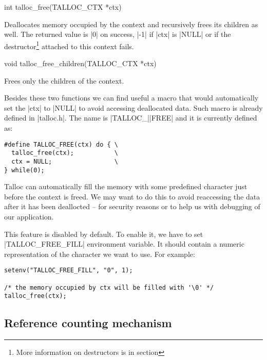 \begin{funcproto}
int talloc_free(TALLOC_CTX *ctx)
\end{funcproto}
\begin{funcdesc}
  Deallocates memory occupied by the context and recursively frees its
  children as well. The returned value is |0| on success, |-1| if |ctx| is
  |NULL| or if the destructor\footnote{More information on destructors is in
  section } attached to this context fails.
\end{funcdesc}
\begin{funcproto}
void talloc_free_children(TALLOC_CTX *ctx)
\end{funcproto}
\begin{funcdesc}
  Frees only the children of the context.
\end{funcdesc}
\funclistend
Besides these two functions we can find useful a macro that would automatically
set the |ctx| to |NULL| to avoid accessing deallocated data. Such macro is
already defined in |talloc.h|. The name is |TALLOC_||FREE| and it is
currently defined as:

\begin{lstlisting}[caption={TALLOC_FREE(ctx)},label=lst:TALLOC_FREE]
#define TALLOC_FREE(ctx) do { \
  talloc_free(ctx);           \
  ctx = NULL;                 \
} while(0);
\end{lstlisting}

\noindent
Talloc can automatically fill the memory with some predefined character just
before the context is freed. We may want to do this to avoid reaccessing the
data after it has been deallocted -- for security reasons or to help us with
debugging of our application.

This feature is disabled by default. To enable it, we have to set
|TALLOC_FREE_FILL| environment variable. It should contain a numeric
representation of the character we want to use. For example:

\begin{lstlisting}[caption={Automatically fill the memory}]
setenv("TALLOC_FREE_FILL", "0", 1);

/* the memory occupied by ctx will be filled with '\0' */
talloc_free(ctx);
\end{lstlisting}

\subsection{Reference counting mechanism}
\label{talloc:ref-counter}

